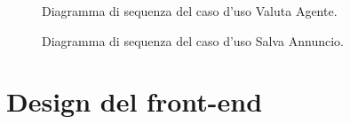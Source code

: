 \begin{figure}[H]
        \caption{Diagramma di sequenza del caso d'uso Valuta Agente.}
    \label{fig:Diagramma di sequenza del caso d'uso Valuta Agente}
\end{figure}

\begin{figure}[H]
    \caption{Diagramma di sequenza del caso d'uso Salva Annuncio.}
    \label{fig:Diagramma di sequenza del caso d'uso Salva Annuncio}
\end{figure}

\section{Design del front-end}